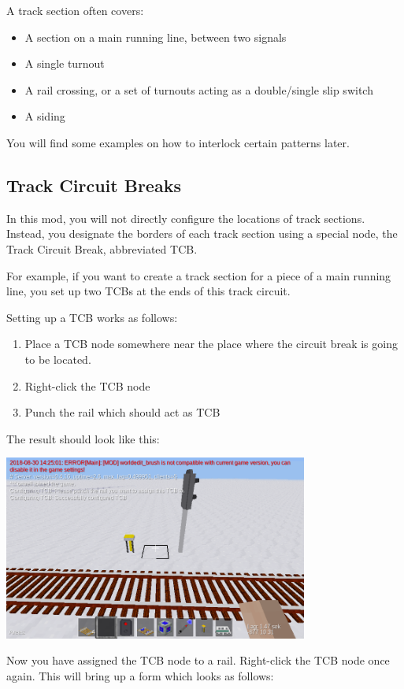 \documentclass[english]{paper}
\begin{document}
A track section often covers:
\begin{itemize}
\item A section on a main running line, between two signals
\item A single turnout
\item A rail crossing, or a set of turnouts acting as a double/single slip
switch
\item A siding
\end{itemize}
You will find some examples on how to interlock certain patterns later.

\subsection{Track Circuit Breaks}

In this mod, you will not directly configure the locations of track
sections. Instead, you designate the borders of each track section
using a special node, the Track Circuit Break, abbreviated TCB.

For example, if you want to create a track section for a piece of
a main running line, you set up two TCBs at the ends of this track
circuit.

Setting up a TCB works as follows:
\begin{enumerate}
\item Place a TCB node somewhere near the place where the circuit break
is going to be located.
\item Right-click the TCB node
\item Punch the rail which should act as TCB
\end{enumerate}
The result should look like this:

\includegraphics[width=10cm]{0_home_moritz_Home_Projekte_Minetest_minetest_m___s_assets_lyx_img_screenshot_20180830_142551.png}

Now you have assigned the TCB node to a rail. Right-click the TCB
node once again. This will bring up a form which looks as follows:
\end{document}
